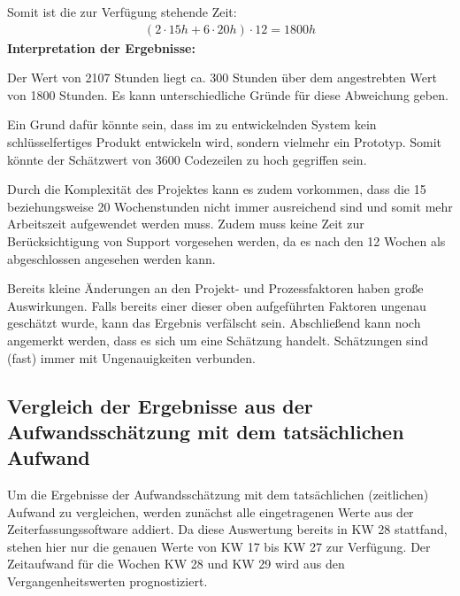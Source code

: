\documentclass[../review_3.tex]{subfiles}
\begin{document}
Somit ist die zur Verfügung stehende Zeit:
\begin{align*}
    (2\cdot15 h+6\cdot20 h)\cdot12=1800h
\end{align*}
\textbf{Interpretation der Ergebnisse:}

Der Wert von 2107 Stunden liegt ca. 300 Stunden über dem angestrebten Wert von 1800 Stunden. Es kann unterschiedliche Gründe für diese Abweichung geben.

Ein Grund dafür könnte sein, dass im zu entwickelnden System kein schlüsselfertiges Produkt entwickeln wird, sondern vielmehr ein Prototyp. Somit könnte der Schätzwert von 3600 Codezeilen zu hoch gegriffen sein.

Durch die Komplexität des Projektes kann es zudem vorkommen, dass die 15 beziehungsweise 20 Wochenstunden nicht immer ausreichend sind und somit mehr Arbeitszeit aufgewendet werden muss.
Zudem muss keine Zeit zur Berücksichtigung von Support vorgesehen werden, da es nach den 12 Wochen als abgeschlossen angesehen werden kann.

Bereits kleine Änderungen an den Projekt- und Prozessfaktoren haben große Auswirkungen. Falls bereits einer dieser oben aufgeführten Faktoren ungenau geschätzt wurde, kann das Ergebnis verfälscht sein.
Abschließend kann noch angemerkt werden, dass es sich um eine Schätzung handelt. Schätzungen sind (fast) immer mit Ungenauigkeiten verbunden.

\subsection{Vergleich der Ergebnisse aus der Aufwandsschätzung mit dem tatsächlichen Aufwand} \label{kap2}

Um die Ergebnisse der Aufwandsschätzung mit dem tatsächlichen (zeitlichen) Aufwand zu vergleichen, werden zunächst alle eingetragenen Werte aus der Zeiterfassungssoftware addiert. Da diese Auswertung bereits in KW 28 stattfand, stehen hier nur die genauen Werte von KW 17 bis KW 27 zur Verfügung. Der Zeitaufwand für die Wochen KW 28 und KW 29 wird aus den Vergangenheitswerten prognostiziert.
\end{document}
